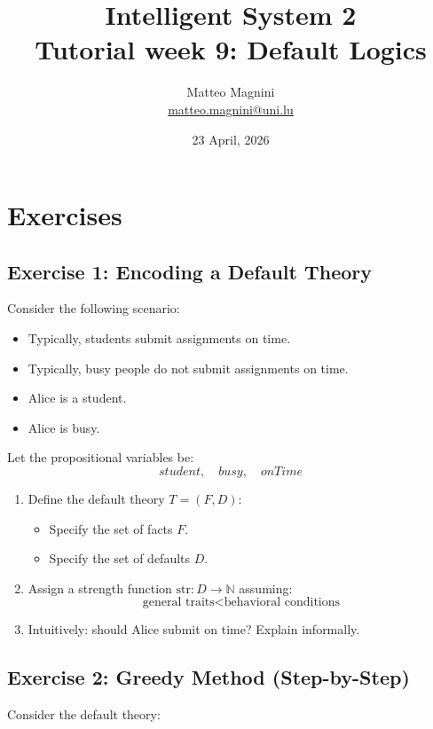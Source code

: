 \documentclass[11pt]{article}
\title{
    Intelligent System 2\\
    Tutorial week 9: Default Logics
}
\author{
    Matteo Magnini\\
    \href{mailto:matteo.magnini@uni.lu}{matteo.magnini@uni.lu}
}
\date{
    23 April, 2026
}
\begin{document}
\maketitle

\section{Exercises}

\subsection{Exercise 1: Encoding a Default Theory}

Consider the following scenario:

\begin{itemize}
    \item Typically, students submit assignments on time.
    \item Typically, busy people do not submit assignments on time.
    \item Alice is a student.
    \item Alice is busy.
\end{itemize}

Let the propositional variables be:
\[
student, \quad busy, \quad onTime
\]

\begin{enumerate}
    \item Define the default theory $T = (F, D)$:
    \begin{itemize}
        \item Specify the set of facts $F$.
        \item Specify the set of defaults $D$.
    \end{itemize}

    \item Assign a strength function $\text{str}: D \rightarrow \mathbb{N}$ assuming:
    \[
    \text{general traits} < \text{behavioral conditions}
    \]

    \item Intuitively: should Alice submit on time? Explain informally.
\end{enumerate}

\subsection{Exercise 2: Greedy Method (Step-by-Step)}

Consider the default theory:
\end{document}
